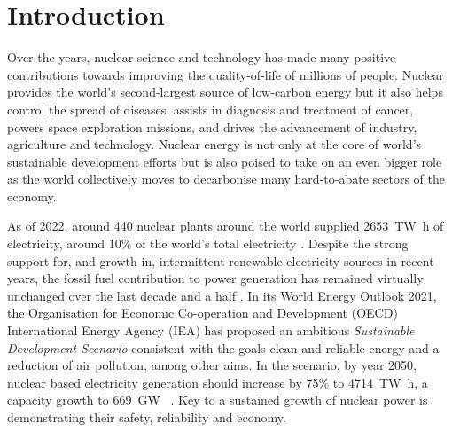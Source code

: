 \chapter{Introduction} \label{chap:introduction}

	Over the years, nuclear science and technology has made many positive contributions towards improving the quality-of-life of millions of people. Nuclear provides the world's second-largest source of low-carbon energy but it also helps control the spread of diseases, assists in diagnosis and treatment of cancer, powers space exploration missions, and drives the advancement of industry, agriculture and technology. Nuclear energy is not only at the core of world's sustainable development efforts but is also poised to take on an even bigger role as the world collectively moves to decarbonise many hard-to-abate sectors of the economy. 

	As of 2022, around 440 nuclear plants around the world supplied \SI{2653}{\tera\watt\hour} of electricity, around 10\% of the world's total electricity \cite{WNA:2019aa}. Despite the strong support for, and growth in, intermittent renewable electricity sources in recent years, the fossil fuel contribution to power generation has remained virtually unchanged over the last decade and a half \cite{WNA:2019aa}. In its World Energy Outlook 2021, the Organisation for Economic Co-operation and Development (OECD) International Energy Agency (IEA)  has proposed an ambitious \emph{Sustainable Development Scenario} consistent with the goals clean and reliable energy and a reduction of air pollution, among other aims. In the scenario, by year 2050, nuclear based electricity generation should increase by 75\% to \SI{4714}{\tera\watt\hour}, a  capacity growth to \SI{669}{\giga\watt\electric} \cite{IEA:2018aa}. Key to a sustained growth of nuclear power is demonstrating their safety, reliability and economy.
	
